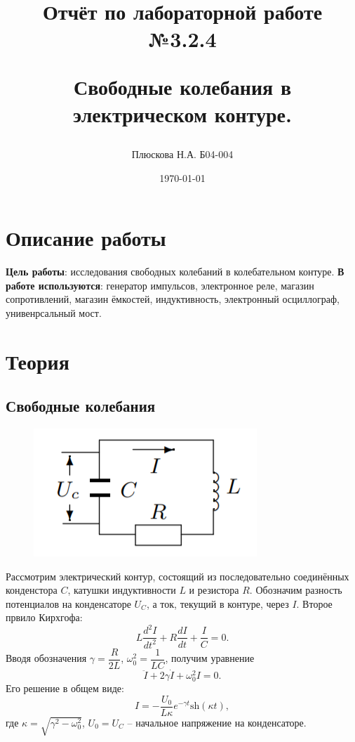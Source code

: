 \documentclass[a4paper,12pt]{report}
\title{Отчёт по лабораторной работе №3.2.4 

Свободные колебания в электрическом контуре.}
\author{Плюскова Н.А. Б04-004 }
\date{\today}
\begin{document}
\maketitle
\section*{\huge{Описание работы}}
\textbf{Цель работы}: исследования свободных колебаний в колебательном контуре.
\textbf{В работе используются}: генератор импульсов, электронное реле, магазин сопротивлений, магазин ёмкостей, индуктивность, электронный осциллограф, унивенрсальный мост.
\section*{Теория}
\subsection*{Свободные колебания}
\begin{figure}
\includegraphics[scale=0.7]{2.png}
\end{figure}
Рассмотрим электрический контур, состоящий из последовательно соединённых конденстора $C$, катушки индуктивности $L$ и резистора $R$. Обозначим разность потенциалов на конденсаторе $U_C$, а ток, текущий в контуре, через $I$. Второе првило Кирхгофа:
\begin{equation}
L \dfrac{d^2I}{dt^2}+R\dfrac{dI}{dt}+\dfrac{I}{C}=0.
\end{equation}
Вводя обозначения $\gamma = \dfrac{R}{2L}$, $\omega_0^2=\dfrac{1}{LC}$, получим уравнение
\begin{equation}
\ddot{I}+2\gamma\dot{I}+\omega_0^2I=0.
\end{equation}
Его решение в общем виде:
\begin{equation}
I = -\dfrac{U_0}{L\kappa}e^{-\gamma t}\text{sh}(\kappa t), 
\end{equation}
где $\kappa = \sqrt{\gamma^2 - \omega_0^2}$, $U_0 = U_C$ -- начальное напряжение на конденсаторе.
\end{document}
